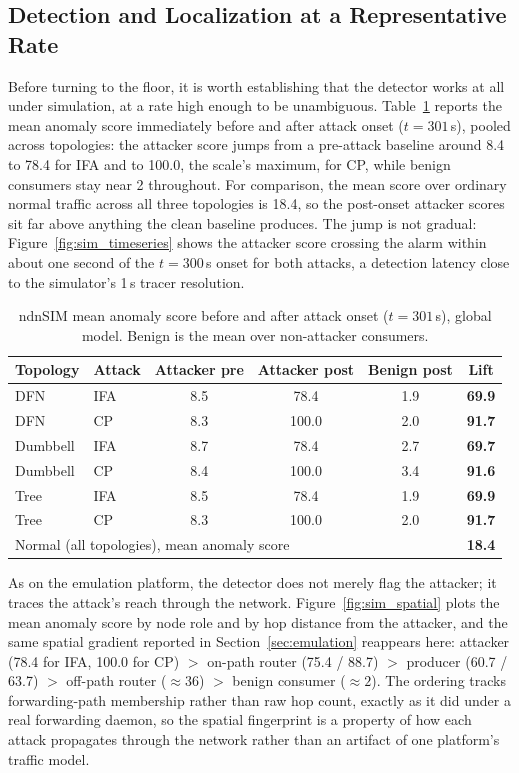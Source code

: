 \subsection{Detection and Localization at a Representative Rate}

Before turning to the floor, it is worth establishing that the detector works at all under simulation, at a rate high enough to be unambiguous. Table~\ref{tab:sim-lift} reports the mean anomaly score immediately before and after attack onset ($t = 301$\,s), pooled across topologies: the attacker score jumps from a pre-attack baseline around 8.4 to 78.4 for IFA and to 100.0, the scale's maximum, for CP, while benign consumers stay near 2 throughout. For comparison, the mean score over ordinary normal traffic across all three topologies is 18.4, so the post-onset attacker scores sit far above anything the clean baseline produces. The jump is not gradual: Figure~\ref{fig:sim_timeseries} shows the attacker score crossing the alarm within about one second of the $t = 300$\,s onset for both attacks, a detection latency close to the simulator's 1\,s tracer resolution.

\begin{table}[t]
\centering
\caption{ndnSIM mean anomaly score before and after attack onset ($t = 301$\,s), global model. Benign is the mean over non-attacker consumers.}
\label{tab:sim-lift}
\begin{tabular}{@{}llcccc@{}}
\toprule
\textbf{Topology} & \textbf{Attack} & \textbf{Attacker pre} & \textbf{Attacker post} & \textbf{Benign post} & \textbf{Lift} \\
\midrule
DFN      & IFA & 8.5 & 78.4  & 1.9 & \textbf{69.9} \\
DFN      & CP  & 8.3 & 100.0 & 2.0 & \textbf{91.7} \\
Dumbbell & IFA & 8.7 & 78.4  & 2.7 & \textbf{69.7} \\
Dumbbell & CP  & 8.4 & 100.0 & 3.4 & \textbf{91.6} \\
Tree     & IFA & 8.5 & 78.4  & 1.9 & \textbf{69.9} \\
Tree     & CP  & 8.3 & 100.0 & 2.0 & \textbf{91.7} \\
\midrule
\multicolumn{5}{l}{Normal (all topologies), mean anomaly score} & \textbf{18.4} \\
\bottomrule
\end{tabular}
\end{table}

As on the emulation platform, the detector does not merely flag the attacker; it traces the attack's reach through the network. Figure~\ref{fig:sim_spatial} plots the mean anomaly score by node role and by hop distance from the attacker, and the same spatial gradient reported in Section~\ref{sec:emulation} reappears here: attacker (78.4 for IFA, 100.0 for CP) $>$ on-path router (75.4 / 88.7) $>$ producer (60.7 / 63.7) $>$ off-path router ($\approx 36$) $>$ benign consumer ($\approx 2$). The ordering tracks forwarding-path membership rather than raw hop count, exactly as it did under a real forwarding daemon, so the spatial fingerprint is a property of how each attack propagates through the network rather than an artifact of one platform's traffic model.

